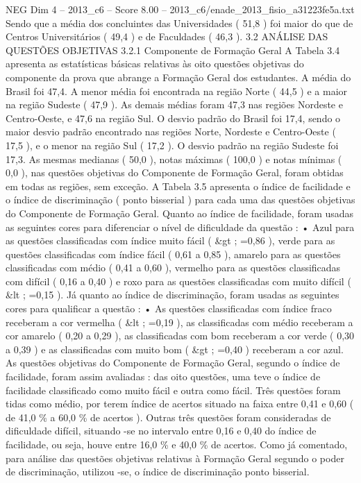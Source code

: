 \begin{textsample}{NEG Dim 4 – 2013\_c6 – Score 8.00 – 2013\_c6/enade\_2013\_fisio\_a31223fe5a.txt}
Sendo que a média dos concluintes das Universidades ( 51,8 ) foi maior do que de Centros Universitários ( 49,4 ) e de Faculdades ( 46,3 ). 3.2 ANÁLISE DAS QUESTÕES OBJETIVAS 3.2.1 Componente de Formação Geral A Tabela 3.4 apresenta as estatísticas básicas relativas às oito questões objetivas do componente da prova que abrange a Formação Geral dos estudantes.
A média do Brasil foi 47,4.
A menor média foi encontrada na região Norte ( 44,5 ) e a maior na região Sudeste ( 47,9 ).
As demais médias foram 47,3 nas regiões Nordeste e Centro-Oeste, e 47,6 na região Sul.
O desvio padrão do Brasil foi 17,4, sendo o maior desvio padrão encontrado nas regiões Norte, Nordeste e Centro-Oeste ( 17,5 ), e o menor na região Sul ( 17,2 ).
O desvio padrão na região Sudeste foi 17,3.
As mesmas medianas ( 50,0 ), notas máximas ( 100,0 ) e notas mínimas ( 0,0 ), nas questões objetivas do Componente de Formação Geral, foram obtidas em todas as regiões, sem exceção.
A Tabela 3.5 apresenta o índice de facilidade e o índice de discriminação ( ponto bisserial ) para cada uma das questões objetivas do Componente de Formação Geral.
Quanto ao índice de facilidade, foram usadas as seguintes cores para diferenciar o nível de dificuldade da questão : • Azul para as questões classificadas com índice muito fácil ( \&gt ; =0,86 ), verde para as questões classificadas com índice fácil ( 0,61 a 0,85 ), amarelo para as questões classificadas com médio ( 0,41 a 0,60 ), vermelho para as questões classificadas com difícil ( 0,16 a 0,40 ) e roxo para as questões classificadas com muito difícil ( \&lt ; =0,15 ).
Já quanto ao índice de discriminação, foram usadas as seguintes cores para qualificar a questão : • As questões classificadas com índice fraco receberam a cor vermelha ( \&lt ; =0,19 ), as classificadas com médio receberam a cor amarelo ( 0,20 a 0,29 ), as classificadas com bom receberam a cor verde ( 0,30 a 0,39 ) e as classificadas com muito bom ( \&gt ; =0,40 ) receberam a cor azul.
As questões objetivas do Componente de Formação Geral, segundo o índice de facilidade, foram assim avaliadas : das oito questões, uma teve o índice de facilidade classificado como muito fácil e outra como fácil.
Três questões foram tidas como médio, por terem índice de acertos situado na faixa entre 0,41 e 0,60 ( de 41,0 \% a 60,0 \% de acertos ).
Outras três questões foram consideradas de dificuldade difícil, situando -se no intervalo entre 0,16 e 0,40 do índice de facilidade, ou seja, houve entre 16,0 \% e 40,0 \% de acertos.
Como já comentado, para análise das questões objetivas relativas à Formação Geral segundo o poder de discriminação, utilizou -se, o índice de discriminação ponto bisserial.

\end{textsample}
